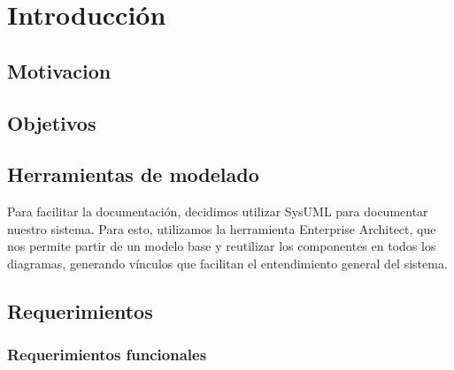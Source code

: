 \chapter{Introducción} %
\label{cha:introduccion}

\section{Motivacion} %
\label{sec:motivacion}


\section{Objetivos} %
\label{sec:objetivos}







\section{Herramientas de modelado} %
\label{sec:herramientas_de_modelado}

Para facilitar la documentación, decidimos utilizar SysUML para documentar nuestro sistema. Para esto, utilizamos la herramienta Enterprise Architect, que nos permite partir de un modelo base y reutilizar los componentes en todos los diagramas, generando vínculos que facilitan el entendimiento general del sistema.


\section{Requerimientos} %
\label{sec:requerimientos}

\subsection{Requerimientos funcionales} %
\label{sub:requerimientos_funcionales}

